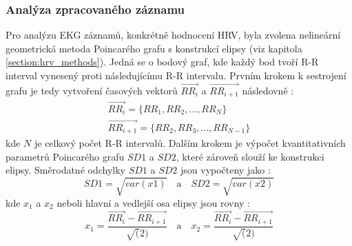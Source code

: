\subsubsection{Analýza zpracovaného záznamu}
\label{section:analysis}
Pro analýzu EKG záznamů, konkrétně hodnocení HRV, byla zvolena nelineární
geometrická metoda Poincarého grafu s konstrukcí elipsy (viz kapitola
\ref{section:hrv_methods}). Jedná se o bodový graf, kde každý bod tvoří R-R
interval vynesený proti následujícímu R-R intervalu. Prvním krokem k sestrojení
grafu je tedy vytvoření časových vektorů $\overrightarrow{RR_i}$ a
$\overrightarrow{RR_{i+1}}$ následovně \cite{Mazhar2007}:
\begin{gather}
    \overrightarrow{RR_i} = \{RR_1, RR_2,...,RR_{N}\} \\
    \overrightarrow{RR_{i+1}} = \{RR_2, RR_3,...,RR_{N-1}\}
\end{gather}
kde $N$ je celkový počet R-R intervalů. Dalším krokem je výpočet kvantitativních
parametrů Poincarého grafu $SD1$ a $SD2$, které zároveň slouží ke konstrukci
elipsy. Směrodatné odchylky $SD1$ a $SD2$ jsou vypočteny jako \cite{Mazhar2007}:
\begin{equation}
    SD1 = \sqrt{var(x1)}
    \quad \textrm{a} \quad
    SD2 = \sqrt{var(x2)}
\end{equation}
kde $x_1$ a $x_2$ neboli hlavní a vedlejší osa elipsy jsou rovny \cite{Mazhar2007}:
\begin{equation}
    x_1 = \frac{\overrightarrow{RR_i}-\overrightarrow{RR_{i+1}}}{\sqrt(2)}
    \quad \textrm{a} \quad
    x_2 = \frac{\overrightarrow{RR_i}-\overrightarrow{RR_{i+1}}}{\sqrt(2)}
\end{equation}

